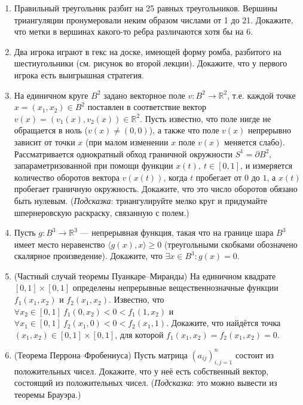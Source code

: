\documentclass[12pt]{article}
\def\ra{\rightarrow}
\def\RR{\mathbb{R}}
\begin{document}
\begin{enumerate}
  \item Правильный треугольник разбит на 25 равных треугольников. Вершины триангуляции пронумеровали неким образом числами от 1 до 21. Докажите, что метки в вершинах какого-то ребра различаются хотя бы на 6.

  \item Два игрока играют в гекс на доске, имеющей форму ромба, разбитого на шестиугольники (см. рисунок во второй лекции). Докажите, что у первого игрока есть выигрышная стратегия.

  \item На единичном круге $B^2$ задано векторное поле $v: B^2 \ra \RR^2$, т.е. каждой точке $x = (x_1,x_2) \in B^2$ поставлен в соответствие вектор $v(x) = (v_1(x), v_2(x)) \in \RR^2$. Пусть известно, что поле нигде не обращается в ноль ($v(x) \neq (0,0)$), а также что поле $v(x)$ непрерывно зависит от точки $x$ (при малом изменении $x$ поле $v(x)$ меняется слабо). Рассматривается однократный обход граничной окружности $S^1 = \partial B^2$, запараметризованной при помощи функции $x(t), \ t\in[0,1]$, и измеряется количество оборотов вектора $v(x(t))$, когда $t$ пробегает от $0$ до $1$, а $x(t)$ пробегает граничную окружность. Докажите, что это число оборотов обязано быть нулевым.
  (\emph{Подсказка}: триангулируйте мелко круг и придумайте шпернеровскую раскраску, связанную с полем.)

  \item Пусть $g : B^3 \ra \RR^3$ --- непрерывная функция, такая что на границе шара $B^3$ имеет место неравенство $\langle g(x),x \rangle \geqslant 0$ (треугольными скобками обозначено скалярное произведение). Докажите, что $\exists x \in B^3 : g(x)=0$.

  \item (Частный случай теоремы Пуанкаре--Миранды) На единичном квадрате $[0,1]\times[0,1]$ определены непрерывные вещественнозначные функции $f_1(x_1, x_2)$ и $ f_2(x_1, x_2)$. Известно, что $\forall x_2\in[0,1] \ f_1(0,x_2) < 0 < f_1(1,x_2)$ и $\forall x_1\in[0,1] \ f_2(x_1,0) < 0 < f_2(x_1,1)$. Докажите, что найдётся точка $(x_1, x_2) \in [0,1]\times[0,1]$, для которой $f_1(x_1, x_2) = f_2(x_1, x_2) = 0$.

  \item (Теорема Перрона--Фробениуса) Пусть матрица $(a_{ij})_{i,j=1}^n$ состоит из положительных чисел. Докажите, что у неё есть собственный вектор, состоящий из положительных чисел.
  (\emph{Подсказка}: это можно вывести из теоремы Брауэра.)


\end{enumerate}
\end{document}
